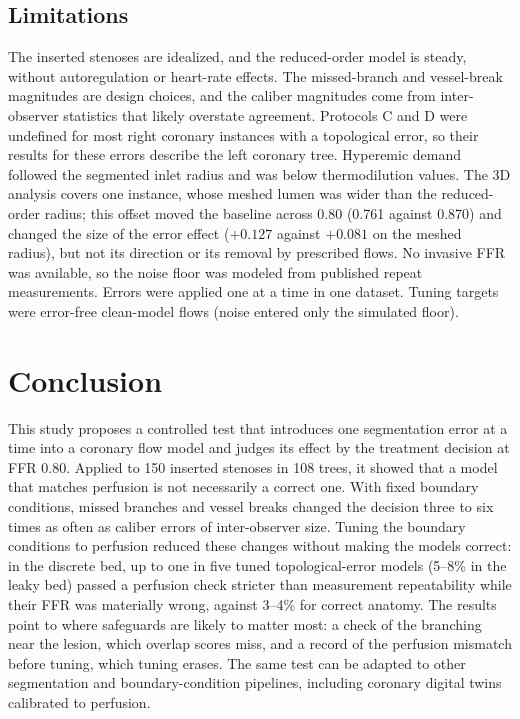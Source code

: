 \documentclass[journal,twoside,web]{ieeecolor}
\begin{document}
\subsection{Limitations}
The inserted stenoses are idealized, and the reduced-order model is steady, without autoregulation or heart-rate
effects. The missed-branch and vessel-break magnitudes are design choices, and the caliber magnitudes come from
inter-observer statistics that likely overstate agreement. Protocols C and D were undefined for most right coronary
instances with a topological error, so their results for these errors describe the left coronary tree. Hyperemic
demand followed the segmented inlet radius and was below thermodilution values. The 3D analysis covers one instance, whose
meshed lumen was wider than the reduced-order radius; this offset moved the baseline
across 0.80 (0.761 against 0.870) and changed the size of the error effect ($+0.127$ against $+0.081$ on the meshed radius), but not its
direction or its removal by prescribed flows. No invasive FFR was available, so the noise floor was modeled from published repeat
measurements. Errors were applied one at a time in one dataset. Tuning targets were error-free clean-model flows
(noise entered only the simulated floor).

\section{Conclusion}
This study proposes a controlled test that introduces one segmentation error at a time into a coronary flow model and judges
its effect by the treatment decision at FFR 0.80. Applied to 150 inserted stenoses in 108 trees, it showed that a model that matches
perfusion is not necessarily a correct one. With fixed boundary conditions, missed branches and vessel breaks changed the decision three to six times
as often as caliber errors of inter-observer size. Tuning the boundary conditions to perfusion reduced these
changes without making the models correct: in the discrete bed, up to one in five tuned topological-error models (5--8\% in the leaky bed) passed a perfusion check stricter than
measurement repeatability while their FFR was materially wrong, against 3--4\% for correct anatomy. The results
point to where safeguards are likely to matter most: a check of the branching near the lesion, which overlap scores miss, and
a record of the perfusion mismatch before tuning, which tuning erases. The same test can be adapted to other
segmentation and boundary-condition pipelines, including coronary digital twins calibrated to perfusion.
\end{document}

